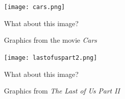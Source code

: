 \documentclass[12pt]{beamer}
\begin{document}
  \begin{frame}
    \begin{figure}
      \centering
      \texttt{[image: cars.png]}
      \caption{Graphics from the movie \textit{Cars}}\label{fig:cars}

      What about this image?
    \end{figure}
  \end{frame}

  \begin{frame}
    \begin{figure}
      \centering
      \texttt{[image: lastofuspart2.png]}
      \caption{Graphics from \textit{The Last of Us Part II}}\label{tlou2}

      What about this image?
    \end{figure}
  \end{frame}
\end{document}
